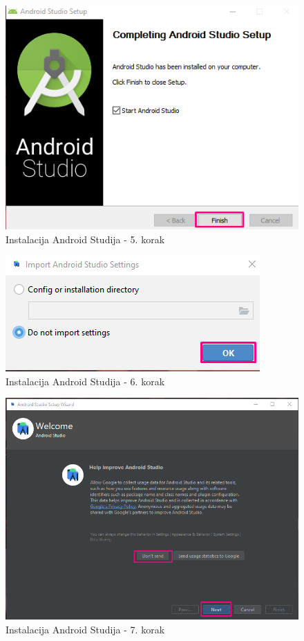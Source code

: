 \documentclass[11pt,a4paper,twoside]{article}
\begin{document}
\begin{figure}[!h]
	\centering
	\includegraphics{install_05.png}
	\caption{Instalacija Android Studija - 5. korak}
	\label{fig:install_05}	
\end{figure}

\begin{figure}[!h]
	\centering
	\includegraphics{install_06.png}
	\caption{Instalacija Android Studija - 6. korak}
	\label{fig:install_06}	
\end{figure}

\begin{figure}[!h]
	\centering
	\includegraphics[width=\textwidth]{install_07.png}
	\caption{Instalacija Android Studija - 7. korak}
	\label{fig:install_07}	
\end{figure}
\end{document}
